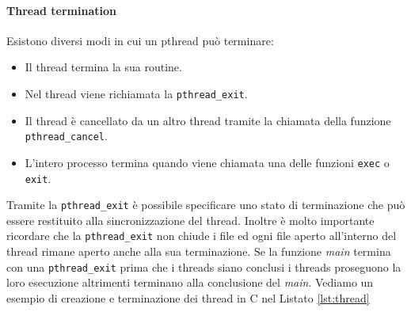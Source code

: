 \paragraph{Thread termination}
Esistono diversi modi in cui un pthread può terminare:
\begin{itemize}
\item Il thread termina la sua routine.
\item Nel thread viene richiamata la \texttt{pthread\_exit}.
\item Il thread è cancellato da un altro thread tramite la chiamata della funzione \texttt{pthread\_cancel}.
\item L'intero processo termina quando viene chiamata una delle funzioni \texttt{exec} o \texttt{exit}.
\end{itemize}
Tramite la \texttt{pthread\_exit} è possibile specificare uno stato di terminazione che può essere restituito alla sincronizzazione del thread. Inoltre è molto importante ricordare che la \texttt{pthread\_exit} non chiude i file ed ogni file aperto all'interno del thread rimane aperto anche alla sua terminazione.
Se la funzione \emph{main} termina con una \texttt{pthread\_exit} prima che i threads siano conclusi i threads proseguono la loro esecuzione altrimenti terminano alla conclusione del \emph{main}.
Vediamo un esempio di creazione e terminazione dei thread in C nel Listato \ref{lst:thread}

